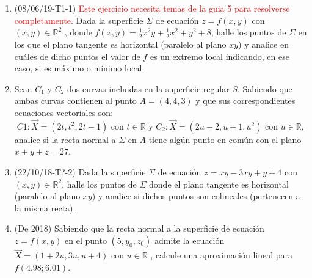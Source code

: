\documentclass[12pt,a4paper]{article}
\newcommand{\red}[1]{\textcolor{red}{#1}}
\newcommand{\R}{\mathbb{R}}
\newcommand{\y}{\text{ y }}
\begin{document}
\begin{enumerate}
	\item (08/06/19-T1-1) \red{Este ejercicio necesita temas de la guia 5 para resolverse completamente.} Dada la superficie $ \Sigma $ de ecuación $ z = f ( x , y ) $ con $ ( x , y ) \in\R^2$ , donde $ f ( x , y ) = \frac{1}{2} x^2 y + \frac{1}{2} x^2 + y^2 + 8 $, halle los puntos de $ \Sigma $ en los que el plano tangente es horizontal (paralelo al plano $ xy $) y analice en	cuáles de dicho puntos el valor de $ f $ es un extremo local indicando, en ese caso, si es máximo o mínimo local.
	
	\item Sean $ C_1 \y C_2 $ dos curvas incluidas en la superficie regular $ S $. Sabiendo que ambas curvas contienen al punto $ A = ( 4 , 4 , 3 ) $ y que sus correspondientes ecuaciones vectoriales son:
	\[C 1 : \vec{X} = ( 2 t , t^2 , 2 t - 1 )\text{ con } t \in\R \y C_2 : \vec{X} = ( 2 u - 2 , u + 1 , u^2 ) \text{ con } u \in \R,\]
	analice si la recta normal a $ \Sigma $ en $ A $ tiene algún punto en común con el plano $ x + y + z = 27  $.
	
	\item (22/10/18-T?-2) Dada la superficie $ \Sigma $ de ecuación $ z = x y - 3 x y + y + 4 $ con $ ( x , y )\in\R^2$, halle los puntos de $ \Sigma $ donde el plano tangente es horizontal (paralelo al plano $ xy  $) y analice si dichos puntos son colineales (pertenecen a la misma recta).
	
	\item (De 2018) Sabiendo que la recta normal a la superficie de ecuación $ z = f(x, y) $ en el punto $ (5, y_0 , z_0 ) $ admite la ecuación $ \vec{X} = (1 + 2 u , 3 u , u + 4) $ con $ u \in\R $ , calcule una aproximación lineal para $ f(4.98; 6.01) $.
\end{enumerate}
	
\end{document}
